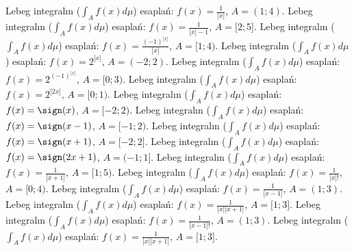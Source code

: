 Lebeg integralın (\(\int_{A}^{}{f(x)d\mu}\)) esaplań: \(f(x) = \frac{1}{\lbrack x\rbrack}\), \(A = (1;4)\).
Lebeg integralın (\(\int_{A}^{}{f(x)d\mu}\)) esaplań: \(f(x) = \frac{1}{\lbrack x\rbrack - 1}\), \(A = \lbrack 2;5\rbrack\).
Lebeg integralın (\(\int_{A}^{}{f(x)d\mu}\)) esaplań: \(f(x) = \frac{( - 1)^{\lbrack x\rbrack}}{\lbrack x\rbrack}\), \(A = \lbrack 1;4)\).
Lebeg integralın (\(\int_{A}^{}{f(x)d\mu}\)) esaplań: \(f(x) = 2^{\lbrack x\rbrack}\), \(A = ( - 2;2)\).
Lebeg integralın (\(\int_{A}^{}{f(x)d\mu}\)) esaplań: \(f(x) = 2^{( - 1)^{\lbrack x\rbrack}}\), \(A = \lbrack 0;3)\).
Lebeg integralın (\(\int_{A}^{}{f(x)d\mu}\)) esaplań: \(f(x) = 2^{\lbrack 2x\rbrack}\), \(A = \lbrack 0;1)\).
Lebeg integralın (\(\int_{A}^{}{f(x)d\mu}\)) esaplań: \(f(x) = \sign(x)\), \(A = \lbrack - 2;2)\).
Lebeg integralın (\(\int_{A}^{}{f(x)d\mu}\)) esaplań: \(f(x) = \sign(x - 1)\), \(A = \lbrack - 1;2)\).
Lebeg integralın (\(\int_{A}^{}{f(x)d\mu}\)) esaplań: \(f(x) = \sign(x + 1)\), \(A = \lbrack - 2;2\rbrack\).
Lebeg integralın (\(\int_{A}^{}{f(x)d\mu}\)) esaplań: \(f(x) = \sign(2x + 1)\), \(A = ( - 1;1\rbrack\).
Lebeg integralın (\(\int_{A}^{}{f(x)d\mu}\)) esaplań: \(f(x) = \frac{1}{\lbrack x + 1\rbrack}\), \(A = \lbrack 1;5)\).
Lebeg integralın (\(\int_{A}^{}{f(x)d\mu}\)) esaplań: \(f(x) = \frac{1}{\lbrack x\rbrack!}\), \(A = \lbrack 0;4)\).
Lebeg integralın (\(\int_{A}^{}{f(x)d\mu}\)) esaplań: \(f(x) = \frac{1}{\lbrack x - 1\rbrack}\), \(A = (1;3)\).
Lebeg integralın (\(\int_{A}^{}{f(x)d\mu}\)) esaplań: \(f(x) = \frac{1}{\lbrack x\rbrack\lbrack x + 1\rbrack}\), \(A = \lbrack 1;3\rbrack\).
Lebeg integralın (\(\int_{A}^{}{f(x)d\mu}\)) esaplań: \(f(x) = \frac{1}{\lbrack x - 1\rbrack!}\), \(A = (1;3)\).
Lebeg integralın (\(\int_{A}^{}{f(x)d\mu}\)) esaplań: \(f(x) = \frac{1}{\lbrack x\rbrack\lbrack x + 1\rbrack}\), \(A = \lbrack 1;3\rbrack\).